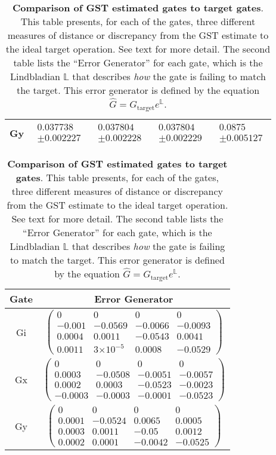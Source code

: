 \documentclass{article}[11pt]
\providecommand{\e}[1]{\ensuremath{\times 10^{#1}}}
\begin{document}
\begin{table}[h]
\begin{center}
\begin{tabular}[l]{|c|c|c|c|c|}
Gy & $ \begin{array}{c} 0.037738 \\ \pm 0.002227 \end{array} $ & $ \begin{array}{c} 0.037804 \\ \pm 0.002228 \end{array} $ & $ \begin{array}{c} 0.037804 \\ \pm 0.002229 \end{array} $ & $ \begin{array}{c} 0.0875 \\ \pm 0.005127 \end{array} $ \\ \hline
\end{tabular}

\vspace{2em}
\begin{tabular}[l]{|c|c|}
\hline
Gate & Error Generator \\ \hline
Gi & $ \left(\!\!\begin{array}{cccc}
0 & 0 & 0 & 0 \\ 
-0.001 & -0.0569 & -0.0066 & -0.0093 \\ 
0.0004 & 0.0011 & -0.0543 & 0.0041 \\ 
0.0011 & 3\e{-5} & 0.0008 & -0.0529
 \end{array}\!\!\right) $
 \\ \hline
Gx & $ \left(\!\!\begin{array}{cccc}
0 & 0 & 0 & 0 \\ 
0.0003 & -0.0508 & -0.0051 & -0.0057 \\ 
0.0002 & 0.0003 & -0.0523 & -0.0023 \\ 
-0.0003 & -0.0003 & -0.0001 & -0.0523
 \end{array}\!\!\right) $
 \\ \hline
Gy & $ \left(\!\!\begin{array}{cccc}
0 & 0 & 0 & 0 \\ 
0.0001 & -0.0524 & 0.0065 & 0.0005 \\ 
0.0003 & 0.0011 & -0.05 & 0.0012 \\ 
0.0002 & 0.0001 & -0.0042 & -0.0525
 \end{array}\!\!\right) $
 \\ \hline
\end{tabular}

\caption{\textbf{Comparison of GST estimated gates to target gates}.  This table presents, for each of the gates, three different measures of distance or discrepancy from the GST estimate to the ideal target operation.  See text for more detail.  The second table lists the ``Error Generator'' for each gate, which is the Lindbladian $\mathbb{L}$ that describes \emph{how} the gate is failing to match the target.  This error generator is defined by the equation $\hat{G} = G_{\mathrm{target}}e^{\mathbb{L}}$. \label{bestGatesetVsTargetTable}}
\end{center}
\end{table}
\end{document}
